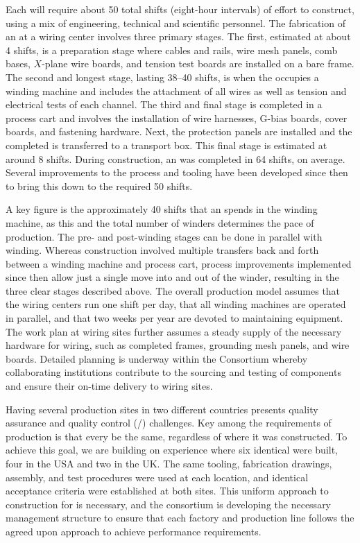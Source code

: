 Each  will require about \num{50} total shifts (eight-hour intervals) of effort to construct, using a mix of engineering, technical and scientific personnel.  The fabrication of an  at a wiring center involves three primary stages. The first, estimated at about \num{4} shifts, is a preparation stage where  cables and rails, wire mesh panels, comb bases, $X$-plane wire boards, and tension test boards are installed on a bare  frame. The second and longest stage, lasting \num{38}--\num{40} shifts, is when the  occupies a winding machine and includes the attachment of all wires as well as tension and electrical tests of each channel.  The third and final stage is completed in a process cart and involves the installation of wire harnesses, G-bias boards, cover boards, and  fastening hardware.  Next, the protection panels are installed and the completed  is transferred to a transport box. This final stage is estimated at around \num{8} shifts.   During  construction, an  was completed in \num{64} shifts, on average. Several improvements to the process and tooling have been developed since then to bring this down to the required \num{50} shifts. 

A key figure is the approximately \num{40} shifts that an  spends in the winding machine, as this and the total number of winders determines the pace of production. The pre- and post-winding stages can be done in parallel with winding.  Whereas  construction involved multiple transfers back and forth between a winding machine and process cart, process improvements implemented since then allow just a single move into and out of the winder, resulting in the three clear stages described above.  The overall production model assumes that the  wiring centers run one shift per day, that all winding machines are operated in parallel, and that two weeks per year are devoted to maintaining equipment.  The work plan at wiring sites further assumes a steady supply of the necessary hardware for  wiring, such as completed frames, grounding mesh panels, and wire boards.  Detailed planning is underway within the   Consortium whereby collaborating institutions contribute to the sourcing and testing of components and ensure their on-time delivery to wiring sites.        

Having several  production sites in two different countries presents quality assurance and quality control (/) challenges. Key among the requirements of production is that every  be the same, regardless of where it was constructed. To achieve this goal, we are building on  experience where six identical  were built, four in the USA and two in the UK. The same tooling, fabrication drawings, assembly, and test procedures were used at each location, and identical acceptance criteria were established at both sites.  This uniform approach to construction for  is necessary, and the  consortium is developing the necessary management structure to ensure that each factory and production line follows the agreed upon approach to achieve  performance requirements.


